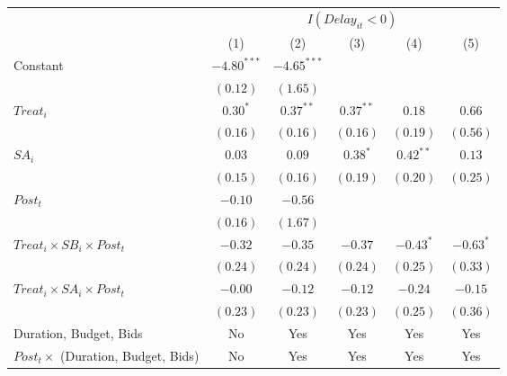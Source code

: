 \documentclass[
]{article}
\begin{document}
\begin{table}
\begin{center}
\begin{tabular}{l c c c c c}
\hline
 & \multicolumn{5}{c}{$I(Delay_{it}<0)$} \\
\cline{2-6}
 & (1) & (2) & (3) & (4) & (5) \\
\hline
Constant                                   & $-4.80^{***}$ & $-4.65^{***}$ &             &             &             \\
                                           & $(0.12)$      & $(1.65)$      &             &             &             \\
$Treat_i$                                  & $0.30^{*}$    & $0.37^{**}$   & $0.37^{**}$ & $0.18$      & $0.66$      \\
                                           & $(0.16)$      & $(0.16)$      & $(0.16)$    & $(0.19)$    & $(0.56)$    \\
$SA_i$                                     & $0.03$        & $0.09$        & $0.38^{*}$  & $0.42^{**}$ & $0.13$      \\
                                           & $(0.15)$      & $(0.16)$      & $(0.19)$    & $(0.20)$    & $(0.25)$    \\
$Post_t$                                   & $-0.10$       & $-0.56$       &             &             &             \\
                                           & $(0.16)$      & $(1.67)$      &             &             &             \\
$Treat_i \times SB_i \times Post_t$        & $-0.32$       & $-0.35$       & $-0.37$     & $-0.43^{*}$ & $-0.63^{*}$ \\
                                           & $(0.24)$      & $(0.24)$      & $(0.24)$    & $(0.25)$    & $(0.33)$    \\
$Treat_i \times SA_i \times Post_t$        & $-0.00$       & $-0.12$       & $-0.12$     & $-0.24$     & $-0.15$     \\
                                           & $(0.23)$      & $(0.23)$      & $(0.23)$    & $(0.25)$    & $(0.36)$    \\
\hline
Duration, Budget, Bids                     & No            & Yes           & Yes         & Yes         & Yes         \\
$Post_t \times $  (Duration, Budget, Bids) & No            & Yes           & Yes         & Yes         & Yes         \\

\end{tabular}
\end{center}
\end{table}
\end{document}
